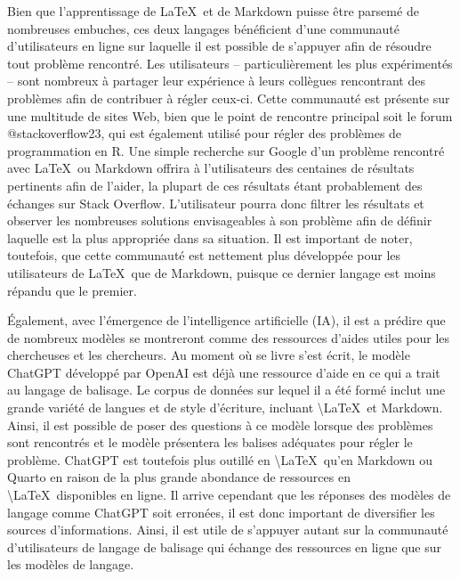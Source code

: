 \documentclass[
  letterpaper,
]{scrbook}
\begin{document}
Bien que l'apprentissage de \LaTeX~et de Markdown puisse être parsemé de
nombreuses embuches, ces deux langages bénéficient d'une communauté
d'utilisateurs en ligne sur laquelle il est possible de s'appuyer afin
de résoudre tout problème rencontré. Les utilisateurs --
particulièrement les plus expérimentés -- sont nombreux à partager leur
expérience à leurs collègues rencontrant des problèmes afin de
contribuer à régler ceux-ci. Cette communauté est présente sur une
multitude de sites Web, bien que le point de rencontre principal soit le
forum @stackoverflow23, qui est également utilisé pour régler des
problèmes de programmation en R. Une simple recherche sur Google d'un
problème rencontré avec \LaTeX~ou Markdown offrira à l'utilisateurs des
centaines de résultats pertinents afin de l'aider, la plupart de ces
résultats étant probablement des échanges sur Stack Overflow.
L'utilisateur pourra donc filtrer les résultats et observer les
nombreuses solutions envisageables à son problème afin de définir
laquelle est la plus appropriée dans sa situation. Il est important de
noter, toutefois, que cette communauté est nettement plus développée
pour les utilisateurs de \LaTeX~que de Markdown, puisque ce dernier
langage est moins répandu que le premier.

Également, avec l'émergence de l'intelligence artificielle (IA), il est
a prédire que de nombreux modèles se montreront comme des ressources
d'aides utiles pour les chercheuses et les chercheurs. Au moment où se
livre s'est écrit, le modèle ChatGPT développé par OpenAI est déjà une
ressource d'aide en ce qui a trait au langage de balisage. Le corpus de
données sur lequel il a été formé inclut une grande variété de langues
et de style d'écriture, incluant \textbackslash LaTeX~et Markdown.
Ainsi, il est possible de poser des questions à ce modèle lorsque des
problèmes sont rencontrés et le modèle présentera les balises adéquates
pour régler le problème. ChatGPT est toutefois plus outillé en
\textbackslash LaTeX~qu'en Markdown ou Quarto en raison de la plus
grande abondance de ressources en \textbackslash LaTeX~disponibles en
ligne. Il arrive cependant que les réponses des modèles de langage comme
ChatGPT soit erronées, il est donc important de diversifier les sources
d'informations. Ainsi, il est utile de s'appuyer autant sur la
communauté d'utilisateurs de langage de balisage qui échange des
ressources en ligne que sur les modèles de langage.
\end{document}
